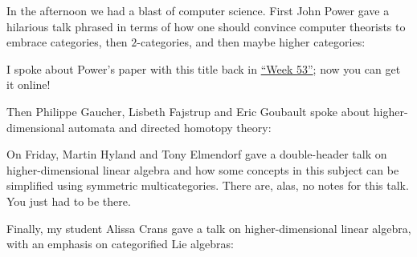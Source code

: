 \documentclass{article}
\def\tightlist{}
\renewcommand{\texttt}[1]{%
  \begingroup
  \ttfamily
  \begingroup\lccode`~=`/\lowercase{\endgroup\def~}{/\discretionary{}{}{}}%
  \begingroup\lccode`~=`[\lowercase{\endgroup\def~}{[\discretionary{}{}{}}%
  \begingroup\lccode`~=`.\lowercase{\endgroup\def~}{.\discretionary{}{}{}}%
  \catcode`/=\active\catcode`[=\active\catcode`.=\active
  \scantokens{#1\noexpand}%
  \endgroup
}
\begin{document}
In the afternoon we had a blast of computer science. First John Power
gave a hilarious talk phrased in terms of how one should convince
computer theorists to embrace categories, then \(2\)-categories, and
then maybe higher categories:


I spoke about Power's paper with this title back in
\protect\hyperlink{week53}{``Week 53''}; now you can get it online!

Then Philippe Gaucher, Lisbeth Fajstrup and Eric Goubault spoke about
higher-dimensional automata and directed homotopy theory:


On Friday, Martin Hyland and Tony Elmendorf gave a double-header talk on
higher-dimensional linear algebra and how some concepts in this subject
can be simplified using symmetric multicategories. There are, alas, no
notes for this talk. You just had to be there.

Finally, my student Alissa Crans gave a talk on higher-dimensional
linear algebra, with an emphasis on categorified Lie algebras:

\end{document}
